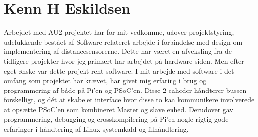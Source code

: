 \section{Kenn H Eskildsen}\label{sec:opnaaede_erfaringer_ke}

Arbejdet med AU2-projektet har for mit vedkomme, udover projektstyring, udelukkende bestået af Software-relateret arbejde i forbindelse med design om implementering af distancesensorerne. 
Dette har været en afveksling fra de tidligere projekter hvor jeg primært har arbejdet på hardware-siden. 
Men efter eget ønske var dette projekt rent software.
I mit arbejde med software i det omfang som projektet har krævet, har givet mig erfaring i brug og programmering af \IIC både på Pi'en og PSoC'en. 
Disse 2 enheder håndterer bussen forskelligt, og dét at skabe et interface hvor disse to kan kommunikere involverede at opsætte PSoC'en som kombineret Master og slave enhed. Derudover gav programmering, debugging og crosskompilering på Pi'en nogle rigtig gode erfaringer i håndtering af Linux systemkald og filhåndtering.